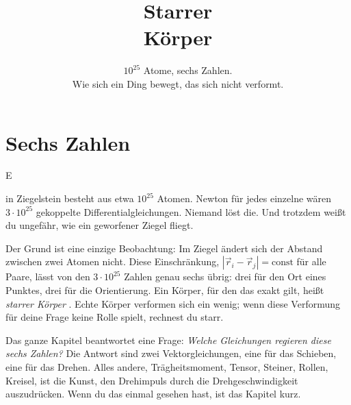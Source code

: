 \documentclass[deutsch]{kaelearn}
\title{Starrer\\Körper}
\subtitle{$10^{25}$ Atome, sechs Zahlen.\\Wie sich ein Ding bewegt, das sich nicht verformt.}
\begin{document}
\makecover

\section{Sechs Zahlen}

\opening{E}{in Ziegelstein} besteht aus etwa $10^{25}$ Atomen. Newton für jedes einzelne wären $3\cdot10^{25}$ gekoppelte
Differentialgleichungen. Niemand löst die. Und trotzdem weißt du ungefähr, wie ein geworfener Ziegel fliegt.

Der Grund ist eine einzige Beobachtung: Im Ziegel ändert sich der Abstand zwischen zwei Atomen nicht. Diese Einschränkung,
$|\vec r_i-\vec r_j| = \text{const}$ für alle Paare, lässt von den $3\cdot10^{25}$ Zahlen genau sechs übrig: drei für den Ort eines
Punktes, drei für die Orientierung. Ein Körper, für den das exakt gilt, heißt \emph{starrer Körper} . Echte Körper
verformen sich ein wenig; wenn diese Verformung für deine Frage keine Rolle spielt, rechnest du starr.

Das ganze Kapitel beantwortet eine Frage: \emph{Welche Gleichungen regieren diese sechs Zahlen?} Die Antwort sind zwei
Vektorgleichungen, eine für das Schieben, eine für das Drehen. Alles andere, Trägheitsmoment, Tensor, Steiner, Rollen, Kreisel, ist
die Kunst, den Drehimpuls durch die Drehgeschwindigkeit auszudrücken. Wenn du das einmal gesehen hast, ist das Kapitel kurz.
\end{document}
